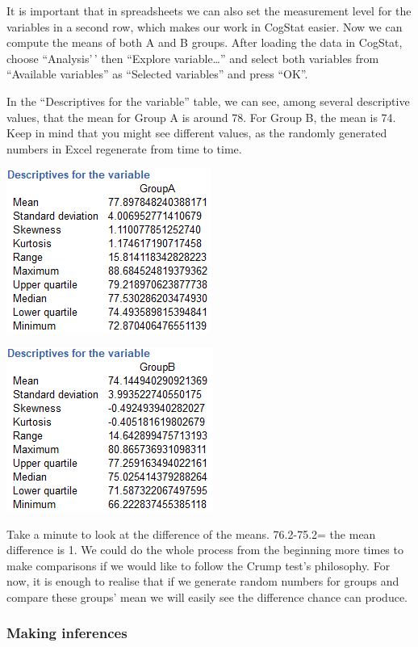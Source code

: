 \documentclass[
]{book}
\begin{document}
It is important that in spreadsheets we can also set the measurement level for the variables in a second row, which makes our work in CogStat easier. Now we can compute the means of both A and B groups. After loading the data in CogStat, choose ``Analysis'\,' then ``Explore variable\ldots{}'' and select both variables from ``Available variables'' as ``Selected variables'' and press ``OK''.

In the ``Descriptives for the variable'' table, we can see, among several descriptive values, that the mean for Group A is around 78. For Group B, the mean is 74. Keep in mind that you might see different values, as the randomly generated numbers in Excel regenerate from time to time.

\includegraphics{img/ch5/5.3.2groupAdescr.png}

\includegraphics{img/ch5/5.3.2groupBdescr.png}

Take a minute to look at the difference of the means. 76.2-75.2= the mean difference is 1. We could do the whole process from the beginning more times to make comparisons if we would like to follow the Crump test's philosophy. For now, it is enough to realise that if we generate random numbers for groups and compare these groups' mean we will easily see the difference chance can produce.

\hypertarget{making-inferences}{%
\subsubsection{Making inferences}\label{making-inferences}}
\end{document}

